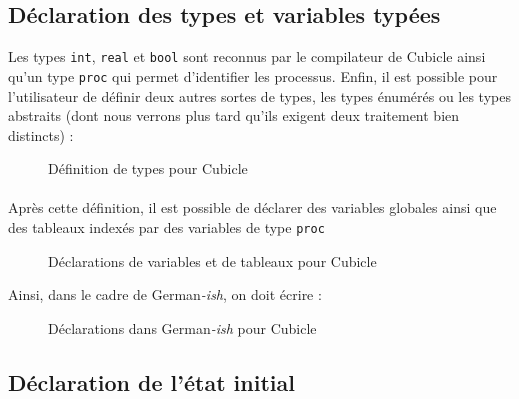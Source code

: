 \documentclass{memoir}
\begin{document}
		\newpage
		\subsection{Déclaration des types et variables typées}
		\label{subsec:decl_types}
		
		Les types \texttt{int}, \texttt{real} et \texttt{bool} sont reconnus par le compilateur de Cubicle ainsi qu'un type \texttt{proc} qui permet d'identifier les processus. Enfin, il est possible pour l'utilisateur de définir deux autres sortes de types, les types énumérés ou les types abstraits (dont nous verrons plus tard qu'ils exigent deux traitement bien distincts) :
		
		\begin{figure}[H]
			\centering	
			\begin{minipage}{0.65\linewidth}
				
			\end{minipage}
			\caption{Définition de types pour Cubicle}
			\label{fig:type_cub}
		\end{figure}
		
		\paragraph{} Après cette définition, il est possible de déclarer des variables globales ainsi que des tableaux indexés par des variables de type \texttt{proc}
		
		\begin{figure}[h]
			\centering	
			\begin{minipage}{0.65\linewidth}
				
			\end{minipage}
			\caption{Déclarations de variables et de tableaux pour Cubicle}
			\label{fig:decl_cub}
		\end{figure}
		 
		Ainsi, dans le cadre de German\textit{-ish}, on doit écrire :
		
		\begin{figure}[h]
			\centering	
			\begin{minipage}{0.65\linewidth}
					
			\end{minipage}
			\caption{Déclarations dans German\textit{-ish} pour Cubicle}
			\label{fig:gish_decl_cub}
		\end{figure}
		
	\newpage
	
		\subsection{Déclaration de l'état initial}
		\label{subsec:decl_init}
		
\end{document}
